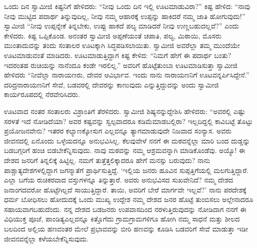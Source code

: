  ಒಂದು ದಿನ ಸ್ವಾಮೀಜಿ ಕಿಷ್ಟನಿಗೆ ಹೇಳಿದರು: “ನೀವು ಒಂದು ದಿನ ಇಲ್ಲಿ ಊಟಮಾಡುವಿರಾ?” ಕಿಷ್ಟ ಹೇಳಿದ: “ನಾವು ನೀವು ಮುಟ್ಟಿದ ಪದಾರ್ಥ ತಿನ್ನುವುದಿಲ್ಲ, ನೀವು ನಮ್ಮ ಆಹಾರಕ್ಕೆ ಉಪ್ಪನ್ನು ಹಾಕಿದರೆ ನಮ್ಮ ಜಾತಿ ಹೋಗುವುದು!” ಸ್ವಾಮೀಜಿ “ನೀವು ಉಪ್ಪನ್ನೇಕೆ ತಿನ್ನಬೇಕು, ಉಪ್ಪು ಹಾಕದೆ ಪಲ್ಯ ಮಾಡಿದರೆ ನೀವು ಉಣ್ಣಬಹುದಲ್ಲವೆ?” ಎಂದು ಕೇಳಿದರು. ಕಿಷ್ಟ ಒಪ್ಪಿಕೊಂಡ. ಅನಂತರ ಸ್ವಾಮೀಜಿ ಅಪ್ಪಣೆಯಂತೆ ಚಪಾತಿ, ಪಲ್ಯ, ಮಿಠಾಯಿ, ಮೊಸರು ಮುಂತಾದುವನ್ನು ತಂದು ಸಂತಾಲರ ಊಟಕ್ಕಾಗಿ ಸಿದ್ಧಪಡಿಸಲಾಯಿತು. ಸ್ವಾಮೀಜಿ ಅವರೆಲ್ಲಾ ತಮ್ಮ ಮುಂದೆಯೇ ಊಟಮಾಡುವಂತೆ ಮಾಡಿದರು. ಊಟಮಾಡುತ್ತಿದ್ದಾಗ ಕಿಷ್ಟ ಕೇಳಿದ: “ನಿಮಗೆ ಹೇಗೆ ಈ ಪದಾರ್ಥ ಬಂತು? ಇದರಂತಹ ರುಚಿಯನ್ನು ನಾನೆಂದೂ ಕಂಡೇ ಇರಲಿಲ್ಲ.” ಅವರಿಗೆ ಹೊಟ್ಟೆತುಂಬಾ ಊಟಮಾಡಿಸುತ್ತಾ ಸ್ವಾಮೀಜಿ ಹೇಳಿದರು “ನೀವೆಲ್ಲಾ ನಾರಾಯಣರು, ದೇವರ ಆವಿರ್ಭಾವ. ಇಂದು ನಾನು ನಾರಾಯಣನಿಗೆ ಊಟವನ್ನರ್ಪಿಸಿದ್ದೇನೆ.” ದರಿದ್ರನಾರಾಯಣನಿಗೆ ಸೇವೆ, ಬಡವರಲ್ಲಿ ದೇವರನ್ನು ಕಾಣುವುದು ಎನ್ನುತ್ತಿದ್ದುದನ್ನು ಅಂದು ಸ್ವಾಮೀಜಿ ಕಾರ್ಯರೂಪದಲ್ಲಿ ನೆರವೇರಿಸಿದರು. 

 ಊಟವಾದ ನಂತರ ಸಂತಾಲರು ವಿಶ್ರಾಂತಿಗೆ ತೆರಳಿದರು. ಸ್ವಾಮೀಜಿ ಶಿಷ್ಯನನ್ನುದ್ದೇಶಿಸಿ ಹೇಳಿದರು: “ಅವರಲ್ಲಿ ಎಷ್ಟು ಸರಳತೆ ಇದೆ ನೋಡಿದೆಯಾ? ಅವರ ಕಷ್ಟವನ್ನು ಸ್ವಲ್ಪವಾದರೂ ಕಡಿಮೆಮಾಡಬಲ್ಲಿರಾ? ಇಲ್ಲದಿದ್ದಲ್ಲಿ ಕಾವಿಬಟ್ಟೆ ತೊಟ್ಟು ಪ್ರಯೋಜನವೇನು? ಇತರರ ಕಲ್ಯಾಣಕ್ಕೋಸುಗ ಎಲ್ಲವನ್ನೂ ತ್ಯಾಗಮಾಡುವುದೇ ನಿಜವಾದ ಸಂನ್ಯಾಸ. ಅವರು ಜೀವನದಲ್ಲಿ ಏನೊಂದು ಒಳ್ಳೆಯದನ್ನೂ ಅನುಭವಿಸಿಲ್ಲ. ಕೆಲವುವೇಳೆ ನನಗೆ ಈ ಮಠವನ್ನೆಲ್ಲಾ ಮಾರಿ ಬಂದ ದುಡ್ಡನ್ನು ಬಡಬಗ್ಗರಿಗೆ ಹಂಚಿ ಬಿಡಬೇಕೆನ್ನಿಸುವುದು. ನಾವು ಮಠವನ್ನು ನಮ್ಮ ಆಶ್ರಮವನ್ನಾಗಿ ಮಾಡಿಕೊಂಡೆವು. ಅಯ್ಯೊ! ಈ ದೇಶದ ಜನರಿಗೆ ತಿನ್ನಲಿಕ್ಕೆ ಹಿಟ್ಟಿಲ್ಲ. ನಮಗೆ ತುತ್ತೆತ್ತಲಿಕ್ಕಾದರೂ ಹೇಗೆ ಮನಸ್ಸು ಬರುವುದು? ನಾನು ಪಾಶ್ಚಾತ್ಯದೇಶಗಳಲ್ಲಿದ್ದಾಗ ಜಗನ್ಮಾತೆಗೆ ಪ್ರಾರ್ಥಿಸುತ್ತಿದ್ದೆ. ‘ಇಲ್ಲಿಯ ಜನರು ಹೂವಿನ ಸುಪ್ಪತ್ತಿಗೆಯಲ್ಲಿ ಮಲಗುತ್ತಿದ್ದಾರೆ. ಎಲ್ಲಾ ಬಗೆಯ ರುಚಿಕರವಾದ ವಸ್ತುಗಳನ್ನೂ ತಿನ್ನುತ್ತಾರೆ. ಅವರು ಅನುಭವಿಸದ ಸುಖವೇನಿದೆ? ನಮ್ಮ ದೇಶದ ಜನಾಂಗದವರೋ ಹೊಟ್ಟೆಗಿಲ್ಲದೆ ಸಾಯುತ್ತಿದ್ದಾರೆ. ತಾಯಿ, ಅವರಿಗೆ ಬೇರೆ ಮಾರ್ಗವೇ ಇಲ್ಲವೆ?’ ನಾನು ಪರದೇಶಕ್ಕೆ ಧರ್ಮ ಬೋಧಿಸಲು ಹೋದುದಕ್ಕೆ ಒಂದು ಮುಖ್ಯ ಉದ್ದೇಶ ನಮ್ಮ ದೇಶದ ಜನರ ಹೊಟ್ಟೆ ತುಂಬಿಸಲು ಅಲ್ಲೇನಾದರೂ ಸಹಾಯವಾಗಬಹುದೆಂದು. ನನ್ನ ದೇಶದ ಬಡಜನರು ಉಪವಾಸದಿಂದ ನರಳುತ್ತಿರುವುದನ್ನು ನೋಡಿದಾಗ ನನಗೆ ಈ ವಿಧಿಯುಕ್ತ ಪೂಜೆ, ಪಾಂಡಿತ್ಯಎಲ್ಲವನ್ನೂ ಕಿತ್ತೊಗೆದು ಗ್ರಾಮಗ್ರಾಮಗಳಿಗೂ ಹೋಗಿ ನಮ್ಮ ಸಾಧನೆ ಮತ್ತು ಶೀಲದ ಬಲದಿಂದ ಅಲ್ಲಿಯ ಹಣವಂತರ ಮೇಲೆ ಪ್ರಭಾವವನ್ನು ಬೀರಿ ಹಣವನ್ನು ಕೂಡಿಸಿ ಬಡವರಿಗೆ ಸೇವೆ ಮಾಡುತ್ತಾ ಇಡೀ ಜೀವನವನ್ನೆಲ್ಲಾ ಕಳೆಯಬೇಕೆನ್ನಿಸುವುದು. 

